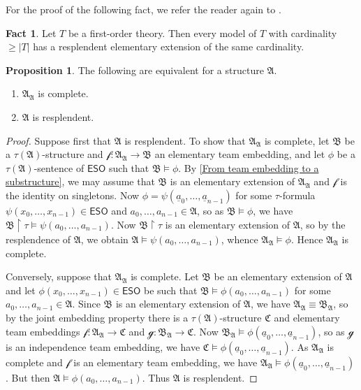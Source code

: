 \documentclass[a4paper]{amsart}
\theoremstyle{definition}
\newtheorem{proposition}[definition]{Proposition}
\newtheorem*{fact}{Fact}
\theoremstyle{remark}
\renewcommand{\restriction}{ {\upharpoonright} }
\newcommand{\A}{\mathcal{A}}
\newcommand{\B}{\mathcal{B}}
\newcommand{\C}{\mathcal{C}}
\newcommand\eso{\mathsf{ESO}}
\theoremstyle{definition}
\renewcommand{\A}{\mathfrak{A}}
\renewcommand{\B}{\mathfrak{B}}
\renewcommand{\C}{\mathfrak{C}}
\newcommand{\f}{\mathcal{f}}
\newcommand{\g}{\mathcal{g}}
\begin{document}
\noindent For the proof of the following fact, we refer the reader again to \cite[Ch.~9.3]{poizat2012course}.
 
\begin{fact}
    Let $T$ be a first-order theory. Then every model of $T$ with cardinality $\geq|T|$ has a resplendent elementary extension of the same cardinality.
\end{fact}

\begin{proposition}\label{complete.resplendent}
    The following are equivalent for a structure $\A$.
    \begin{enumerate}
        \item $\A_\A$ is complete.
        \item $\A$ is resplendent.
    \end{enumerate}
\end{proposition}
\begin{proof}
    Suppose first that $\A$ is resplendent. To show that $\A_\A$ is complete, let $\B$ be a $\tau(\A)$-structure and $\f\colon\A_\A\to\B$ an elementary team embedding, and let $\phi$ be a $\tau(\A)$-sentence of $\eso$ such that $\B\models\phi$. By \cref{From team embedding to a substructure}, we may assume that $\B$ is an elementary extension of $\A_\A$ and $\f$ is the identity on singletons. Now $\phi = \psi(\underline a_0,\dots,\underline a_{n-1})$ for some $\tau$-formula $\psi(x_0,\dots,x_{n-1})\in\eso$ and $a_0,\dots,a_{n-1}\in\A$, so as $\B\models\phi$, we have $\B\restriction\tau\models\psi(a_0,\dots,a_{n-1})$. Now $\B\restriction\tau$ is an elementary extension of $\A$, so by the resplendence of $\A$, we obtain $\A\models\psi(a_0,\dots,a_{n-1})$, whence $\A_\A\models\phi$. Hence $\A_\A$ is complete.

    Conversely, suppose that $\A_\A$ is complete. Let $\B$ be an elementary extension of $\A$ and let $\phi(x_0,\dots,x_{n-1})\in\eso$ be such that $\B\models\phi(a_0,\dots,a_{n-1})$ for some $a_0,\dots,a_{n-1}\in\A$. Since $\B$ is an elementary extension of $\A$, we have $\A_\A\equiv\B_\A$, so by the joint embedding property there is a $\tau(\A)$-structure $\C$ and elementary team embeddings $\f\colon\A_\A\to\C$ and $\g\colon\B_\A\to\C$. Now $\B_\A\models\phi(\underline a_0,\dots,\underline a_{n-1})$, so as $\g$ is an independence team embedding, we have $\C\models\phi(\underline a_0,\dots,\underline a_{n-1})$. As $\A_\A$ is complete and $\f$ is an elementary team embedding, we have $\A_\A\models\phi(\underline a_0,\dots,\underline a_{n-1})$. But then $\A\models\phi(a_0,\dots,a_{n-1})$. Thus $\A$ is resplendent.
\end{proof}
\end{document}
